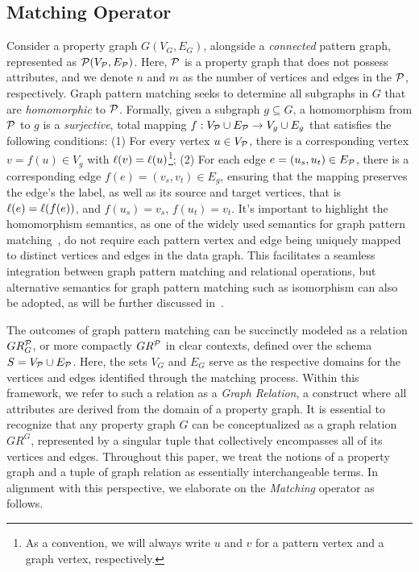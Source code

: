
\subsection{Matching Operator}
\label{sec:matching-operator}
Consider a property graph \(G(V_G, E_G)\), alongside a \emph{connected} pattern graph, represented as \(\mathcal{P}(V_{\mathcal{P}}, E_{\mathcal{P}})\). Here, \(\mathcal{P}\) is a property graph that does not possess attributes, and
we denote $n$ and $m$ as the number of vertices and edges in the $\mathcal{P}$, respectively.
Graph pattern matching seeks to determine all subgraphs in \(G\) that are \emph{homomorphic} to \(\mathcal{P}\).
Formally, given a subgraph $g \subseteq G$, a homomorphism from \(\mathcal{P}\) to \(g\) is a \emph{surjective}, total mapping \(f: V_{\mathcal{P}} \cup E_{\mathcal{P}} \to V_{g} \cup E_{g}\) that satisfies the following conditions: (1) For every vertex \(u \in V_{\mathcal{P}}\), there is a corresponding vertex \(v = f(u) \in V_{g}\) with \(\mathcal{\ell}(v) = \mathcal{\ell}(u)\)\footnote{As a convention, we will always write $u$ and $v$ for a pattern vertex and a graph vertex, respectively.}; (2) For each edge \(e = (u_s, u_t) \in E_{\mathcal{P}}\), there is a corresponding edge \(f(e) = (v_s, v_t) \in E_{g}\), ensuring that the mapping preserves the edge's the label, as well as its source and target vertices, that is \(\mathcal{\ell}(e) = \mathcal{\ell}(f(e))\), and \(f(u_s) = v_s\), \(f(u_t) = v_t\). It's important to highlight the homomorphism semantics, as one of the widely used semantics for graph pattern matching~\cite{angles2017foundations}, do not require each pattern vertex and edge being uniquely mapped to distinct vertices and edges in the data graph. This facilitates a seamless integration between graph pattern matching and relational operations, but alternative semantics for graph pattern matching such as isomorphism can also be adopted, as will be further discussed in~.

The outcomes of graph pattern matching can be succinctly modeled as a relation \(GR_G^{\mathcal{P}}\), or more compactly \(GR^{\mathcal{P}}\) in clear contexts, defined over the schema \(S = V_{\mathcal{P}} \cup E_{\mathcal{P}}\). Here, the sets \(V_G\) and \(E_G\) serve as the respective domains for the vertices and edges identified through the matching process. Within this framework, we refer to such a relation as a \emph{Graph Relation}, a construct where all attributes are derived from the domain of a property graph.
It is essential to recognize that any property graph \(G\) can be conceptualized as a graph relation \(GR^G\), represented by a singular tuple that collectively encompasses all of its vertices and edges. Throughout this paper, we treat the notions of a property graph and a tuple of graph relation as essentially interchangeable terms. In alignment with this perspective, we elaborate on the \emph{Matching} operator as follows.


